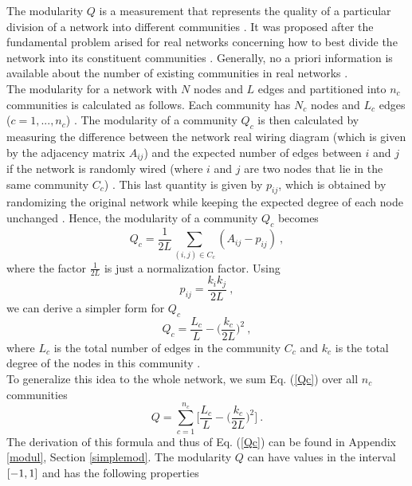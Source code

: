 \documentclass[11 pt , letterpaper , twoside , openright]{book}
\begin{document}
The modularity $Q$ is a measurement that represents the quality of a particular division of a network into different communities \cite{F.Costa2007}. It was proposed after the fundamental problem arised for real networks concerning how to best divide the network into its constituent communities \cite{F.Costa2007}. Generally, no a priori information is available about the number of existing communities in real networks \cite{F.Costa2007}.\\
The modularity for a network with $N$ nodes and $L$ edges and partitioned into $n_c$ communities is calculated as follows. Each community has $N_c$ nodes and $L_c$ edges ($c = 1,..., n_c$) \cite{Albert2016}. The modularity of a community $Q_c$ is then calculated by measuring the difference between the network real wiring diagram (which is given by the adjacency matrix $A_{ij}$) and the expected number of edges between $i$ and $j$ if the network is randomly wired (where $i$ and $j$ are two nodes that lie in the same community $C_c$) \cite{Albert2016}. This last quantity is given by $p_{ij}$, which is obtained by randomizing the original network while keeping the expected degree of each node unchanged \cite{Albert2016}. Hence, the modularity of a community $Q_c$ becomes \cite{Albert2016}
\begin{equation}
	Q_c = \frac{1}{2L}\sum_{(i,j) \in C_c} (A_{ij} - p_{ij}) \ ,
\end{equation}
where the factor $\frac{1}{2L}$ is just a normalization factor. Using \cite{Albert2016}
\begin{equation}
	p_{ij} = \frac{k_ik_j}{2L} \ ,
\end{equation}
we can derive a simpler form for $Q_c$ \cite{Albert2016}
\begin{equation}\label{Qc}
	Q_c = \frac{L_c}{L} - \bigg(\frac{k_c}{2L}\bigg)^2 \ ,
\end{equation}
where $L_c$ is the total number of edges in the community $C_c$ and $k_c$ is the total degree of the nodes in this community \cite{Albert2016}.\\
To generalize this idea to the whole network, we sum Eq. (\ref{Qc}) over all $n_c$ communities \cite{Albert2016}
\begin{equation}\label{mod}
	Q = \sum_{c = 1}^{n_c}\bigg[\frac{L_c}{L} - \bigg(\frac{k_c}{2L}\bigg)^2 \bigg] \ .
\end{equation}
The derivation of this formula and thus of Eq. (\ref{Qc}) can be found in Appendix \ref{modul}, Section \ref{simplemod}. The modularity $Q$ can have values in the interval $\interval{-1}{1}$ and has the following properties \cite{Albert2016}
\end{document}
